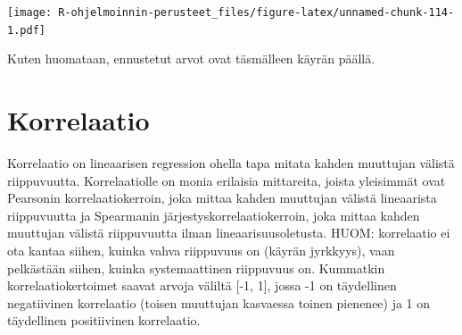 \documentclass[
]{book}
\newenvironment{Shaded}{\begin{snugshade}}{\end{snugshade}}
\newcommand{\AttributeTok}[1]{\textcolor[rgb]{0.77,0.63,0.00}{#1}}
\newcommand{\CommentTok}[1]{\textcolor[rgb]{0.56,0.35,0.01}{\textit{#1}}}
\newcommand{\DecValTok}[1]{\textcolor[rgb]{0.00,0.00,0.81}{#1}}
\newcommand{\FunctionTok}[1]{\textcolor[rgb]{0.00,0.00,0.00}{#1}}
\newcommand{\NormalTok}[1]{#1}
\newcommand{\OtherTok}[1]{\textcolor[rgb]{0.56,0.35,0.01}{#1}}
\newcommand{\SpecialCharTok}[1]{\textcolor[rgb]{0.00,0.00,0.00}{#1}}
\newcommand{\StringTok}[1]{\textcolor[rgb]{0.31,0.60,0.02}{#1}}
\begin{document}
\begin{Shaded}
\end{Shaded}

\texttt{[image: R-ohjelmoinnin-perusteet\_files/figure-latex/unnamed-chunk-114-1.pdf]}

Kuten huomataan, ennustetut arvot ovat täsmälleen käyrän päällä.

\hypertarget{korrelaatio}{%
\section{Korrelaatio}\label{korrelaatio}}

Korrelaatio on lineaarisen regression ohella tapa mitata kahden muuttujan välistä riippuvuutta. Korrelaatiolle on monia erilaisia mittareita, joista yleisimmät ovat Pearsonin korrelaatiokerroin, joka mittaa kahden muuttujan välistä lineaarista riippuvuutta ja Spearmanin järjestyskorrelaatiokerroin, joka mittaa kahden muuttujan välistä riippuvuutta ilman lineaarisuusoletusta. HUOM: korrelaatio ei ota kantaa siihen, kuinka vahva riippuvuus on (käyrän jyrkkyys), vaan pelkästään siihen, kuinka systemaattinen riippuvuus on. Kummatkin korrelaatiokertoimet saavat arvoja väliltä {[}-1, 1{]}, jossa -1 on täydellinen negatiivinen korrelaatio (toisen muuttujan kasvaessa toinen pienenee) ja 1 on täydellinen positiivinen korrelaatio.
\end{document}
